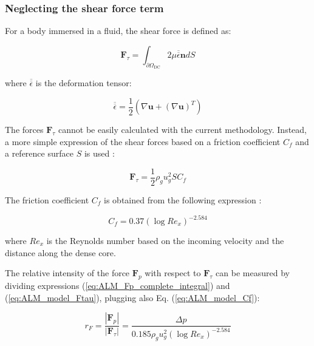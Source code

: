 \subsubsection*{Neglecting the shear force term}

For a body immersed in a fluid, the shear force is defined as:

\begin{equation}
\boldsymbol{F}_\tau = \int_{\partial \Omega_\mathrm{DC}} 2 \mu \overline{\overline{\epsilon}} \boldsymbol{n} dS
\end{equation}

where $\overline{\overline{\epsilon}}$ is the deformation tensor:

\begin{equation}
\overline{\overline{\epsilon}} = \frac{1}{2} \left( \nabla \boldsymbol{u} + \left(\nabla \boldsymbol{u}\right)^T \right)
\end{equation}

The forces $\boldsymbol{F}_\tau$ cannot be easily calculated with the current methodology. Instead, a more simple expression of the shear forces based on a friction coefficient $C_f$ and a reference surface $S$ is used :

\begin{equation}
\label{eq:ALM_model_Ftau}
\boldsymbol{F}_\tau = \frac{1}{2} \rho_g u_g^2 S C_f 
\end{equation}

The friction coefficient $C_f$ is obtained from the following expression :

\begin{equation}
\label{eq:ALM_model_Cf}
C_f = 0.37 \left( \log Re_x \right)^{-2.584}
\end{equation}

where $Re_x$ is the Reynolds number based on the incoming velocity and the distance along the dense core.


The relative intensity of the force $\boldsymbol{F}_p$ with respect to $\boldsymbol{F}_\tau$ can be measured by dividing expressions (\ref{eq:ALM_Fp_complete_integral}) and (\ref{eq:ALM_model_Ftau}), plugging also Eq. (\ref{eq:ALM_model_Cf}):

\begin{equation}
\label{eq:rF_definition}
r_F = \frac{| \boldsymbol{F}_p| }{| \boldsymbol{F}_\tau |} = \frac{\Delta p}{0.185 \rho_g u_g^2 \left( \log Re_x \right)^{-2.584}}
\end{equation}


